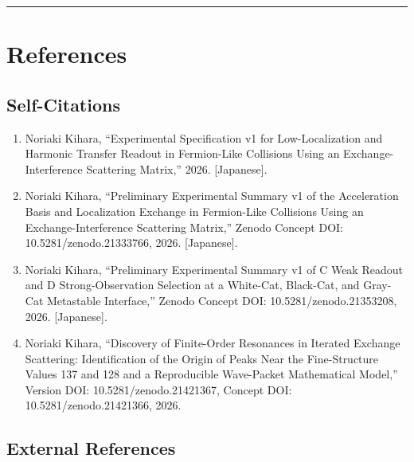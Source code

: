 \documentclass[
  a4paper,
  10pt]{article}
\providecommand{\tightlist}{%
  \setlength{\itemsep}{0pt}\setlength{\parskip}{0pt}}
\begin{document}
\begin{center}\rule{0.5\linewidth}{0.5pt}\end{center}

\section{References}\label{references}

\subsection{Self-Citations}\label{self-citations}

\begin{enumerate}
\def\labelenumi{\arabic{enumi}.}
\tightlist
\item
  Noriaki Kihara, ``Experimental Specification v1 for Low-Localization
  and Harmonic Transfer Readout in Fermion-Like Collisions Using an
  Exchange-Interference Scattering Matrix,'' 2026. {[}Japanese{]}.
\item
  Noriaki Kihara, ``Preliminary Experimental Summary v1 of the
  Acceleration Basis and Localization Exchange in Fermion-Like
  Collisions Using an Exchange-Interference Scattering Matrix,'' Zenodo
  Concept DOI: 10.5281/zenodo.21333766, 2026. {[}Japanese{]}.
\item
  Noriaki Kihara, ``Preliminary Experimental Summary v1 of C Weak
  Readout and D Strong-Observation Selection at a White-Cat, Black-Cat,
  and Gray-Cat Metastable Interface,'' Zenodo Concept DOI:
  10.5281/zenodo.21353208, 2026. {[}Japanese{]}.
\item
  Noriaki Kihara, ``Discovery of Finite-Order Resonances in Iterated
  Exchange Scattering: Identification of the Origin of Peaks Near the
  Fine-Structure Values 137 and 128 and a Reproducible Wave-Packet
  Mathematical Model,'' Version DOI: 10.5281/zenodo.21421367, Concept
  DOI: 10.5281/zenodo.21421366, 2026.
\end{enumerate}

\subsection{External References}\label{external-references}
\end{document}
